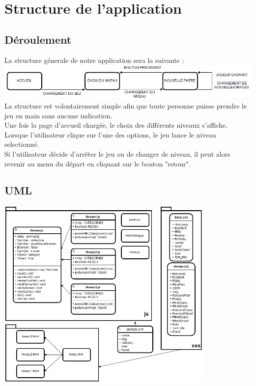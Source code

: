 \documentclass{article}
\begin{document}
\section{Structure de l'application}

\subsection{D\'eroulement}

La structure g\'enerale de notre application sera la suivante :
\vspace{0.5cm}\\
\includegraphics[width=\textwidth]{plan}
\vspace{0.5cm}\\
\hspace*{0.6cm}La structure est volontairement simple afin que toute personne puisse prendre le jeu en main sans aucune indication.\\
Une fois la page d'accueil charg\'ee, le choix des diff\'erents niveaux s'affiche. Lorsque l'utilisateur clique sur l'une des options, le jeu lance le niveau selectionn\'e.\\
Si l'utilisateur d\'ecide d'arr\^eter le jeu ou de changer de niveau, il peut alors revenir au menu du d\'epart en cliquant sur le bouton "retour". 

\subsection{UML}

\begin{center}
\includegraphics[width=0.8\textwidth]{planUml}\\
\end{center}
\end{document}
